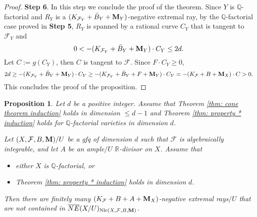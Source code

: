 \documentclass[11pt]{amsart}
\numberwithin{equation}{section}
\newcommand{\Mm}{{\bf{M}}}
\newcommand{\Qq}{\mathbb{Q}}
\newcommand{\Rr}{\mathbb{R}}
\newcommand{\Nlc}{\operatorname{Nlc}}
\newcommand{\Ff}{\mathcal{F}}
\newtheorem{prop}[thm]{Proposition}
\theoremstyle{definition}
\theoremstyle{definition}
\theoremstyle{definition}
\begin{document}
\begin{proof}
\medskip

\noindent\textbf{Step 6}. In this step we conclude the proof of the theorem. Since $Y$ is $\Qq$-factorial and $R_Y$ is a $(K_{\Ff_Y}+\bar B_Y+\Mm_Y)$-negative extremal ray, by the $\Qq$-factorial case proved in \textbf{Step 5}, $R_Y$ is spanned by a rational curve $C_Y$ that is tangent to $\Ff_Y$ and 
$$0<-(K_{\Ff_Y}+\bar B_Y+\Mm_Y)\cdot C_Y\leq 2d.$$
 Let $C:=g(C_Y)$, then $C$ is tangent to $\Ff$. Since $F\cdot C_Y\geq 0$,
$$2d\geq -(K_{\Ff_Y}+\bar B_Y+\Mm_Y)\cdot C_Y\geq -(K_{\Ff_Y}+\bar B_Y+F+\Mm_Y)\cdot C_Y=-(K_{\Ff}+B+\Mm_X)\cdot C>0.$$
This concludes the proof of the proposition.
\end{proof}

\begin{prop}\label{prop: cone finiteness rays}
Let $d$ be a positive integer. Assume that Theorem \ref{thm: cone theorem induction} holds in dimension $\leq d-1$ and Theorem \ref{thm: property * induction} holds for $\Qq$-factorial varieties in dimension $d$. 
       
Let $(X,\Ff,B,\Mm)/U$ be a gfq of dimension $d$ such that $\Ff$ is algebraically integrable, and let $A$ be an ample$/U$ $\Rr$-divisor on $X$. Assume that 
       \begin{itemize}
        \item either $X$ is $\Qq$-factorial, or
        \item Theorem \ref{thm: property * induction} holds in dimension $d$. 
    \end{itemize}
Then there are finitely many $(K_{\Ff}+B+A+\Mm_X)$-negative extremal rays$/U$ that are not contained in $\overline{NE}(X/U)_{\Nlc(X,\Ff,B,\Mm)}$.
\end{prop}
\end{document}
